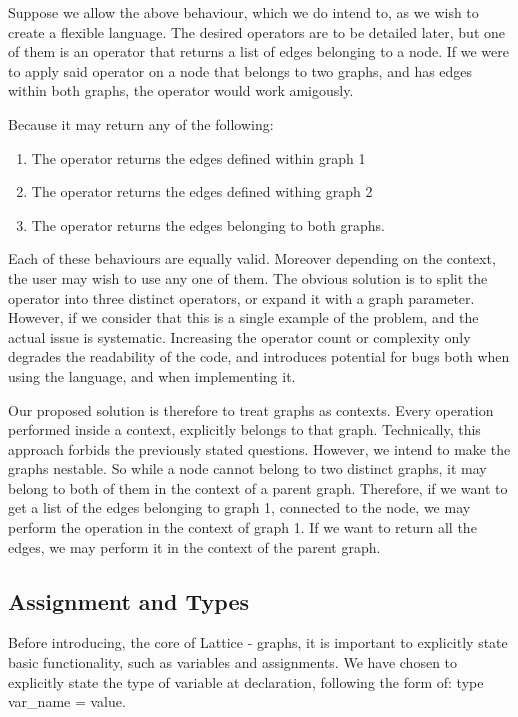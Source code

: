 Suppose we allow the above behaviour, which we do intend to, as we wish to create a flexible language.
The desired  operators are to be detailed later, but one of them is an operator that returns a list of edges belonging to a node.
If we were to apply said operator on a node that belongs to two graphs, and has edges within both graphs, the
operator would work amigously.

Because it may return any of the following:
\begin{enumerate}
    \item The operator returns the edges defined within graph 1
    \item The operator returns the edges defined withing graph 2
    \item The operator returns the edges belonging to both graphs.
\end{enumerate}
Each of these behaviours are equally valid.
Moreover depending on the context, the user may wish to use any one of them.
The obvious solution is to split the operator into three distinct operators, or expand it with a graph parameter.
However, if we consider that this is a single example of the problem, and the actual issue is systematic.
Increasing the operator count or complexity only degrades the readability of the code, and introduces potential for bugs
both when using the language, and when implementing it.

Our proposed solution is therefore to treat graphs as contexts.
Every operation performed inside a context, explicitly belongs to that graph.
Technically, this approach forbids the previously stated questions.
However, we intend to make  the graphs nestable.
So while a node cannot belong to two distinct graphs, it may belong to both of them in the context of a parent graph.
Therefore, if we want to get a list of the edges belonging to graph 1, connected to the node, we may perform the
operation in the context of graph 1. If we want to return all the edges, we may perform it in the context of the parent
graph.

\subsection{Assignment and Types}
Before introducing, the core of Lattice - graphs, it is important to explicitly state basic functionality,
such as variables and assignments.
We have chosen to explicitly state the type of variable at declaration,
following the form of: {type} {var_name} = {value}.

